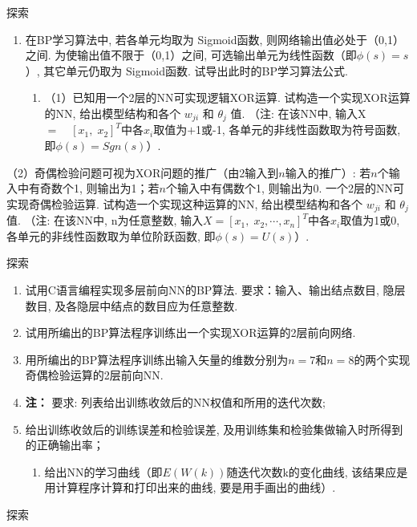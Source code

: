 {\begin{custom}[explorecolor]{探索}
\begin{enumerate}
\item 在BP学习算法中, 若各单元均取为 Sigmoid函数, 则网络输出值必处于（0,1）之间. 为使输出值不限于（0,1）之间, 可选输出单元为线性函数（即$\phi(s)=s$）, 其它单元仍取为 Sigmoid函数. 试导出此时的BP学习算法公式.
	\begin{enumerate}
	\item （1）已知用一个2层的NN可实现逻辑XOR运算. 试构造一个实现XOR运算的NN, 给出模型结构和各个 $w_{ji} $ 和 $\theta_{j} $ 值. （注: 在该NN中, 输入X $= \quad [x_{1} ,\;x_{2} ]^{T}$中各$x_{i} $取值为$+$1或-1, 各单元的非线性函数取为符号函数, 即$\phi (s)=Sgn(s)$）.
	\end{enumerate}
\end{enumerate}
（2）奇偶检验问题可视为XOR问题的推广（由2输入到$n$输入的推广）: 若$n$个输入中有奇数个1, 则输出为1；若$n$个输入中有偶数个1, 则输出为0. 一个2层的NN可实现奇偶检验运算. 试构造一个实现这种运算的NN, 给出模型结构和各个
$w_{ji} $ 和 $\theta_{j}$ 值. （注: 在该NN中, n为任意整数, 输入$X=[x_{1} ,\;x_{2} ,\cdots ,x_{n} ]^{T}$中各$x_{i}$取值为1或0, 各单元的非线性函数取为单位阶跃函数, 即$\phi (s)=U(s)$）.
\end{custom}
\begin{custom}[explorecolor]{探索}
\begin{enumerate}
\item 试用C语言编程实现多层前向NN的BP算法. 要求：输入、输出结点数目, 隐层数目, 及各隐层中结点的数目应为任意整数.
\item 试用所编出的BP算法程序训练出一个实现XOR运算的2层前向网络.
\item 用所编出的BP算法程序训练出输入矢量的维数分别为$n=7$和$n=8$的两个实现奇偶检验运算的2层前向NN.
\item[\textbullet] \textbf{注： }要求: 列表给出训练收敛后的NN权值和所用的迭代次数;
\item 给出训练收敛后的训练误差和检验误差, 及用训练集和检验集做输入时所得到的正确输出率；
	\begin{enumerate}
	\item 给出NN的学习曲线（即$E(W(k))$随迭代次数k的变化曲线, 该结果应是用计算程序计算和打印出来的曲线, 要是用手画出的曲线）.
	\end{enumerate}
\end{enumerate}
\end{custom}
\begin{custom}[explorecolor]{探索}

\end{custom}}
